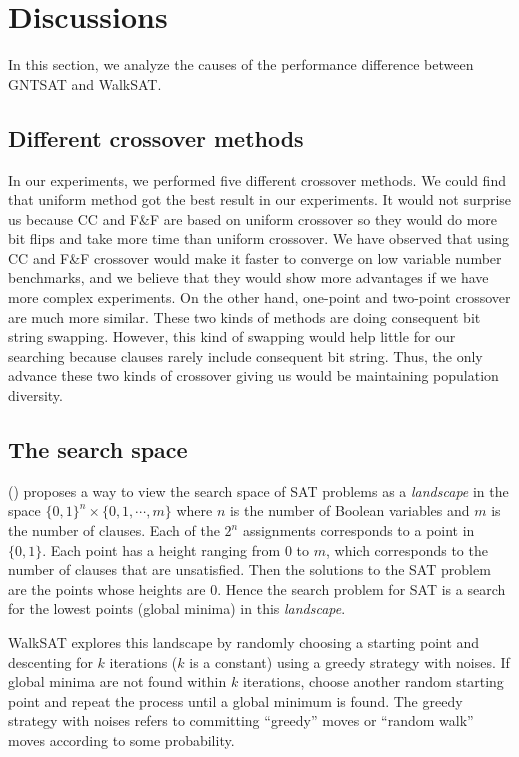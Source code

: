 \section{Discussions}
In this section, we analyze the causes of the performance difference between
GNTSAT and WalkSAT.

\subsection{Different crossover methods}
In our experiments, we performed five different crossover methods. We could
find that uniform method got the best result in our experiments. It would not
surprise us because CC and F&F are based on uniform crossover so they would do
more bit flips and take more time than uniform crossover. We have observed
that using CC and F&F crossover would make it faster to converge on low
variable number benchmarks, and we believe that they would show more
advantages if we have more complex experiments. On the other hand, one-point
and two-point crossover are much more similar. These two kinds of methods are
doing consequent bit string swapping. However, this kind of swapping would
help little for our searching because clauses rarely include consequent bit
string. Thus, the only advance these two kinds of crossover giving us would be
maintaining population diversity.

\subsection{The search space}
\citeauthor{biere2009handbook} (\citeyear{biere2009handbook}) proposes a way to view the search space of
SAT problems as a \textit{landscape} in the space $\{0, 1\}^n \times \{0,1,\cdots,m\}$
where $n$ is the number of Boolean variables and
$m$ is the number of clauses. Each of the
$2^n$ assignments corresponds to a point in
$\{0,1\}$. Each point has a height ranging from
$0$ to $m$, which corresponds to the
number of clauses that are unsatisfied. Then the solutions to the SAT problem
are the points whose heights are $0$. Hence the search
problem for SAT is a search for the lowest points (global minima) in this
\textit{landscape}.

WalkSAT explores this landscape by randomly choosing a starting point and
descenting for $k$ iterations ($k$ is a
constant) using a greedy strategy with noises. If global minima are not found
within $k$ iterations, choose another random starting point
and repeat the process until a global minimum is found. The greedy strategy
with noises refers to committing ``greedy'' moves or ``random walk'' moves
according to some probability.

